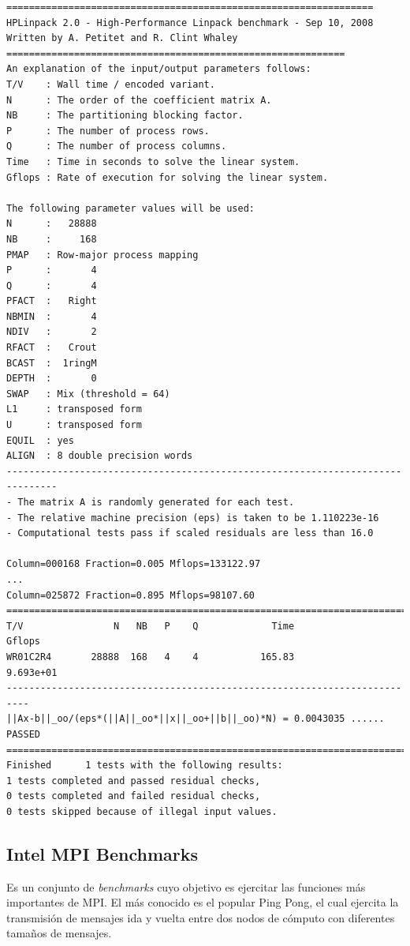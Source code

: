 \documentclass[a4paper]{report}
\begin{document}
\begin{verbatim}
=================================================================
HPLinpack 2.0 - High-Performance Linpack benchmark - Sep 10, 2008
Written by A. Petitet and R. Clint Whaley
============================================================
An explanation of the input/output parameters follows:
T/V    : Wall time / encoded variant.
N      : The order of the coefficient matrix A.
NB     : The partitioning blocking factor.
P      : The number of process rows.
Q      : The number of process columns.
Time   : Time in seconds to solve the linear system.
Gflops : Rate of execution for solving the linear system.

The following parameter values will be used:
N      :   28888
NB     :     168
PMAP   : Row-major process mapping
P      :       4
Q      :       4
PFACT  :   Right
NBMIN  :       4
NDIV   :       2
RFACT  :   Crout
BCAST  :  1ringM
DEPTH  :       0
SWAP   : Mix (threshold = 64)
L1     : transposed form
U      : transposed form
EQUIL  : yes
ALIGN  : 8 double precision words
-------------------------------------------------------------------------------
- The matrix A is randomly generated for each test.
- The relative machine precision (eps) is taken to be 1.110223e-16
- Computational tests pass if scaled residuals are less than 16.0

Column=000168 Fraction=0.005 Mflops=133122.97
...
Column=025872 Fraction=0.895 Mflops=98107.60
==========================================================================
T/V                N   NB   P    Q             Time                 Gflops
WR01C2R4       28888  168   4    4           165.83              9.693e+01
--------------------------------------------------------------------------
||Ax-b||_oo/(eps*(||A||_oo*||x||_oo+||b||_oo)*N) = 0.0043035 ...... PASSED
==========================================================================
Finished      1 tests with the following results:
1 tests completed and passed residual checks,
0 tests completed and failed residual checks,
0 tests skipped because of illegal input values.
\end{verbatim}

\subsection{Intel MPI Benchmarks}

Es un conjunto de {\it benchmarks} cuyo objetivo es ejercitar las funciones
m\'as importantes de MPI. El m\'as conocido es el popular Ping Pong,
el cual ejercita la transmisi\'on de mensajes ida y vuelta entre dos nodos de
c\'omputo con diferentes tama\~nos de mensajes. 
\end{document}
